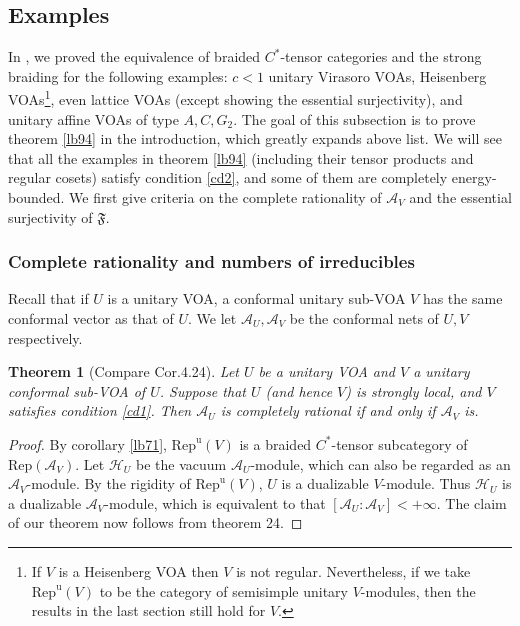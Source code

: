 \documentclass[11pt,b5paper,notitlepage]{article}
\theoremstyle{definition}
\theoremstyle{plain}
\newtheorem{thm}[df]{Theorem}
\newcommand{\fk}{\mathfrak}
\newcommand{\mc}{\mathcal}
\newcommand{\Rep}{\mathrm{Rep}}
\newcommand{\RepuV}{\mathrm{Rep}^{\mathrm u}(V)}
\numberwithin{equation}{subsection}
\begin{document}
\subsection{Examples}\label{lb74}

In \cite{Gui21a}, we  proved the equivalence of braided $C^*$-tensor categories and the strong braiding for the following examples:  $c<1$ unitary Virasoro VOAs, Heisenberg VOAs\footnote{If $V$ is a  Heisenberg VOA then $V$ is not regular. Nevertheless, if we take $\RepuV$ to be the category of semisimple unitary $V$-modules, then the results in the last section still hold for $V$.}, even lattice VOAs (except showing the essential surjectivity), and unitary affine VOAs of type $A,C,G_2$. The goal of this subsection is  to  prove theorem \ref{lb94} in the introduction, which greatly expands above list. We will see that all the examples in theorem \ref{lb94} (including their tensor products and regular cosets) satisfy condition \ref{cd2}, and some of them are  completely energy-bounded.  We first give criteria on the complete rationality of $\mc A_V$ and the essential surjectivity of $\fk F$.

\subsubsection*{Complete rationality and numbers of irreducibles}

Recall that if $U$ is a unitary VOA, a conformal unitary sub-VOA $V$ has the same conformal vector as that of $U$. We let $\mc A_U,\mc A_V$ be the conformal nets of $U,V$ respectively.

\begin{thm}[Compare \cite{Ten24} Cor.4.24]\label{lb84}
	Let $U$ be a unitary VOA and $V$ a unitary conformal sub-VOA of $U$. Suppose that $U$ (and hence $V$) is strongly local, and   $V$ satisfies condition \ref{cd1}. Then $\mc A_U$ is completely rational if and only if $\mc A_V$ is.
\end{thm}

\begin{proof}
	By corollary \ref{lb71}, $\RepuV$ is a braided $C^*$-tensor subcategory of $\Rep(\mc A_V)$. Let $\mc H_U$ be the vacuum $\mc A_U$-module, which can also be regarded as an $\mc A_V$-module. By the rigidity of $\RepuV$, $U$ is a dualizable $V$-module. Thus $\mc H_U$ is a dualizable $\mc A_V$-module, which is equivalent to that $[\mc A_U:\mc A_V]<+\infty$. The claim of our theorem now follows from \cite{Lon03} theorem 24.
\end{proof}
\end{document}
